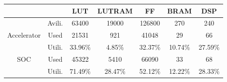 

\begin{tabular}{ccccccc}
\toprule
	 &			&	LUT		&	LUTRAM	&	FF		&	BRAM	&	DSP	\\	\hline
 	 &	Avili.	&	63400	&	19000	&	126800	&	270		&	240 \\	\hline
\multirow{2}{*}{Accelerator}&	Used	&	21531	&	921	&	41048	&	29	&	66\\
							&	Utili.	&	33.96\%	&	4.85\%	&	32.37\%	&	10.74\%	&	27.59\%	\\
					\hline	
\multirow{2}{*}{SOC}		&	Used	&	45322	&	5410	&	66090	&	33	&	68\\
							&	Utili.	&	71.49\%	&	28.47\%	&	52.12\%	&	12.22\%	&	28.33\%	\\

\bottomrule
\end{tabular}


